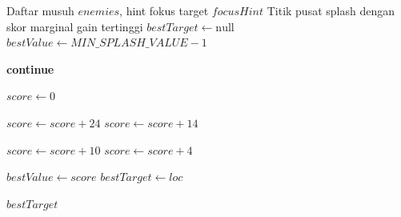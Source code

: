 \begin{breakablealgorithm}
	\caption{Greedy AoE Target Selection pada SplasherBot}
	\label{alg:alt1-splasher-target}
	\begin{algorithmic}[1]
		\Require Daftar musuh $enemies$, hint fokus target $focusHint$
		\Ensure Titik pusat splash dengan skor marginal gain tertinggi
		\State $bestTarget \gets \text{null}$
		\State $bestValue \gets MIN\_SPLASH\_VALUE - 1$

		\State \textbf{continue}
		\EndIf

		\State $score \gets 0$

		\State $score \gets score + 24$
		\State $score \gets score + 14$
		\EndIf
		\EndFor

		\State $score \gets score + 10$
		\State $score \gets score + 4$
		\EndIf
		\EndFor

		\State $bestValue \gets score$
		\State $bestTarget \gets loc$
		\EndIf
		\EndFor

		\State \Return $bestTarget$
		\EndFunction
	\end{algorithmic}
\end{breakablealgorithm}


